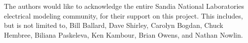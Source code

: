 


The authors would like to acknowledge the entire Sandia National
Laboratories electrical modeling community, for their support 
on this project.  This includes, but is not limited to, Bill Ballard,
Dave Shirley, Carolyn Bogdan, Chuck Hembree, 
Biliana Paskeleva, Ken Kambour, Brian Owens, and Nathan Nowlin.

